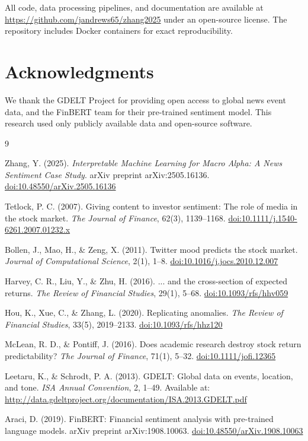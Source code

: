 \documentclass[11pt]{article}
\begin{document}
All code, data processing pipelines, and documentation are available at \url{https://github.com/jandrews65/zhang2025} under an open-source license. The repository includes Docker containers for exact reproducibility.

\section*{Acknowledgments}

We thank the GDELT Project for providing open access to global news event data, and the FinBERT team for their pre-trained sentiment model. This research used only publicly available data and open-source software.


\begin{thebibliography}{9}

Zhang, Y. (2025).
\textit{Interpretable Machine Learning for Macro Alpha: A News Sentiment Case Study}.
arXiv preprint arXiv:2505.16136.
\href{https://doi.org/10.48550/arXiv.2505.16136}{doi:10.48550/arXiv.2505.16136}

Tetlock, P. C. (2007).
Giving content to investor sentiment: The role of media in the stock market.
\textit{The Journal of Finance}, 62(3), 1139--1168.
\href{https://doi.org/10.1111/j.1540-6261.2007.01232.x}{doi:10.1111/j.1540-6261.2007.01232.x}

Bollen, J., Mao, H., \& Zeng, X. (2011).
Twitter mood predicts the stock market.
\textit{Journal of Computational Science}, 2(1), 1--8.
\href{https://doi.org/10.1016/j.jocs.2010.12.007}{doi:10.1016/j.jocs.2010.12.007}

Harvey, C. R., Liu, Y., \& Zhu, H. (2016).
... and the cross-section of expected returns.
\textit{The Review of Financial Studies}, 29(1), 5--68.
\href{https://doi.org/10.1093/rfs/hhv059}{doi:10.1093/rfs/hhv059}

Hou, K., Xue, C., \& Zhang, L. (2020).
Replicating anomalies.
\textit{The Review of Financial Studies}, 33(5), 2019--2133.
\href{https://doi.org/10.1093/rfs/hhz120}{doi:10.1093/rfs/hhz120}

McLean, R. D., \& Pontiff, J. (2016).
Does academic research destroy stock return predictability?
\textit{The Journal of Finance}, 71(1), 5--32.
\href{https://doi.org/10.1111/jofi.12365}{doi:10.1111/jofi.12365}

Leetaru, K., \& Schrodt, P. A. (2013).
GDELT: Global data on events, location, and tone.
\textit{ISA Annual Convention}, 2, 1--49.
Available at: \url{http://data.gdeltproject.org/documentation/ISA.2013.GDELT.pdf}

Araci, D. (2019).
FinBERT: Financial sentiment analysis with pre-trained language models.
arXiv preprint arXiv:1908.10063.
\href{https://doi.org/10.48550/arXiv.1908.10063}{doi:10.48550/arXiv.1908.10063}

\end{thebibliography}
\end{document}
